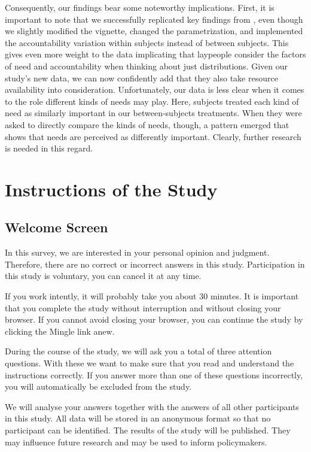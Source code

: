 \documentclass[egregdoesnotlikesansseriftitles]{scrartcl}
\begin{document}
Consequently, our findings bear some noteworthy implications.
First, it is important to note that we successfully replicated key findings from \cite{bauer_need_2020}, even though we slightly modified the vignette, changed the parametrization, and implemented the accountability variation within subjects instead of between subjects.
This gives even more weight to the data implicating that laypeople consider the factors of need and accountability when thinking about just distributions.
Given our study's new data, we can now confidently add that they also take resource availability into consideration.
Unfortunately, our data is less clear when it comes to the role different kinds of needs may play.
Here, subjects treated each kind of need as similarly important in our between-subjects treatments.
When they were asked to directly compare the kinds of needs, though, a pattern emerged that shows that needs are perceived as differently important.
Clearly, further research is needed in this regard.


\clearpage




\clearpage
\appendix
\section{Instructions of the Study}\label{sec:app_instructions}
\subsection*{Welcome Screen}
In this survey, we are interested in your personal opinion and judgment.
Therefore, there are no correct or incorrect answers in this study.
Participation in this study is voluntary, you can cancel it at any time.

If you work intently, it will probably take you about 30 minutes.
It is important that you complete the study without interruption and without closing your browser.
If you cannot avoid closing your browser, you can continue the study by clicking the Mingle link anew.

During the course of the study, we will ask you a total of three attention questions.
With these we want to make sure that you read and understand the instructions correctly.
If you answer more than one of these questions incorrectly, you will automatically be excluded from the study.

We will analyse your answers together with the answers of all other participants in this study.
All data will be stored in an anonymous format so that no participant can be identified.
The results of the study will be published.
They may influence future research and may be used to inform policymakers.
\end{document}
